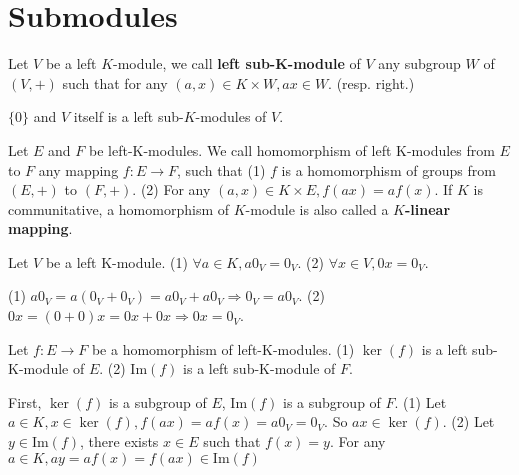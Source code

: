 \documentclass{book}
\numberwithin{equation}{section}
\begin{document}
\section{Submodules}
\begin{definitionenv}
    Let $V$ be a left $K$-module,  we call \textbf{left sub-K-module} of $V$ any subgroup $W$ of $(V, +)$ such that for any $(a, x)\in K\times W, ax\in W$. (resp. right.)
\end{definitionenv}
\begin{exampleenv}
    $\{0\}$ and $V$ itself is a left sub-$K$-modules of $V$.
\end{exampleenv}
\begin{definitionenv}
    Let $E$ and $F$ be left-K-modules. We call homomorphism of left K-modules from $E$ to $F$ any mapping $f:E\rightarrow F$,  such that 
    \newline
    (1) $f$ is a homomorphism of groups from $(E, +)$ to $(F, +)$.
    \newline
    (2) For any $(a, x)\in K\times E, f(ax)=af(x)$.
    \newline
    If $K$ is communitative,  a homomorphism of $K$-module is also called a \textbf{$K$-linear mapping}.
\end{definitionenv}
\begin{lemmaenv}
    Let $V$ be a left K-module.
    \newline
    (1) $\forall a\in K, a0_V=0_V$.
    \newline
    (2) $\forall x\in V, 0x=0_V$.
\end{lemmaenv}
\begin{proofenv}
    \quad
    \newline
    (1) $a0_V=a(0_V+0_V)=a0_V+a0_V\Rightarrow 0_V=a0_V$.
    \newline
    (2) $0x=(0+0)x=0x+0x\Rightarrow 0x=0_V$.
\end{proofenv}
\begin{theoremenv}
    Let $f:E\rightarrow F$ be a homomorphism of left-K-modules.
    \newline 
    (1) $\ker(f)$ is a left sub-K-module of $E$.
    \newline
    (2) $\mathrm{Im}(f)$ is a left sub-K-module of $F$. 
\end{theoremenv}
\begin{proofenv}
    First,  $\ker(f)$ is a subgroup of $E$,  $\mathrm{Im}(f)$ is a subgroup of $F$.
    \newline
    (1) Let $a\in K,  x\in \ker(f),  f(ax)=af(x)=a0_V=0_V$. So $ax\in \ker(f)$.
    \newline
    (2) Let $y\in \mathrm{Im}(f)$,  there exists $x\in E$ such that $f(x)=y$. For any $a\in K, ay=af(x)=f(ax)\in \mathrm{Im}(f)$
\end{proofenv}
\end{document}
